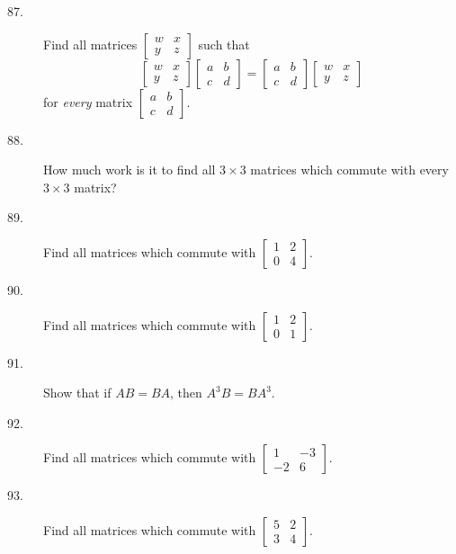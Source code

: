\documentclass{article}
\begin{document}
\begin{description}
  \item[87.] Find all matrices $\begin{bmatrix} w & x \\ y & z \end{bmatrix}$ such that
    \begin{equation*}
    \begin{bmatrix} w & x \\ y & z \end{bmatrix} \begin{bmatrix} a & b \\ c & d \end{bmatrix}
    = \begin{bmatrix} a & b \\ c & d \end{bmatrix} \begin{bmatrix} w & x \\ y & z \end{bmatrix}
    \end{equation*}
    for \emph{every} matrix $\begin{bmatrix} a & b \\ c & d \end{bmatrix}$.

  \item[88.] How much work is it to find all $3 \times 3$ matrices which commute with every $3 \times 3$ matrix?

  \item[89.] Find all matrices which commute with $\begin{bmatrix} 1 & 2 \\ 0 & 4 \end{bmatrix}$.

  \item[90.] Find all matrices which commute with $\begin{bmatrix} 1 & 2 \\ 0 & 1 \end{bmatrix}$.

  \item[91.] Show that if $AB = BA$, then $A^3 B = BA^3$.

  \item[92.] Find all matrices which commute with $\begin{bmatrix} 1 & -3 \\ -2 & 6 \end{bmatrix}$.

  \item[93.] Find all matrices which commute with $\begin{bmatrix} 5 & 2 \\ 3 & 4 \end{bmatrix}$.


\end{description}
\end{document}
